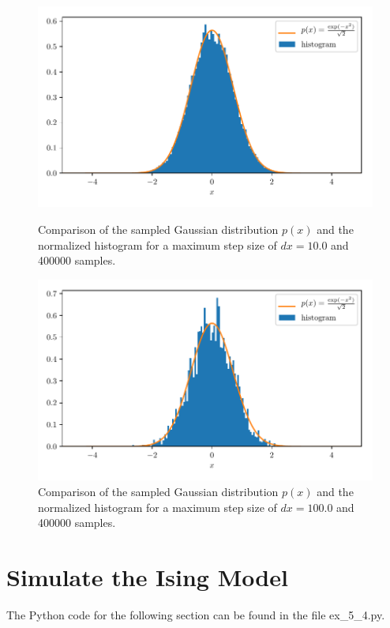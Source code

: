 \documentclass[a4paper,10pt,bibtotoc]{scrartcl}
\begin{document}
\begin{figure}[H]
	\centering
	\includegraphics[width=\linewidth]{hist10.pdf}
	\caption{Comparison of the sampled Gaussian distribution $p(x)$ and the normalized histogram for a maximum step size of $dx=10.0$ and 400000 samples.}
	\label{fig:fig6}
	\includegraphics[width=\linewidth]{hist100.pdf}
	\caption{Comparison of the sampled Gaussian distribution $p(x)$ and the normalized histogram for a maximum step size of $dx=100.0$ and 400000 samples.}
	\label{fig:fig7}
\end{figure}


\section{Simulate the Ising Model}
The Python code for the following section can be found in the file ex\_5\_4.py.
\end{document}
